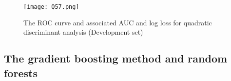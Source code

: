 \documentclass{article}
\begin{document}
 	\begin{figure}[H] 
\centering %
\texttt{[image: Q57.png]} 
\caption{ The ROC curve and associated AUC and log loss for quadratic discriminant analysis (Development set)}
\label{R} %
\end{figure} 
 	
% 	
% 	
 	\subsection{The gradient boosting method and random forests}
\end{document}
